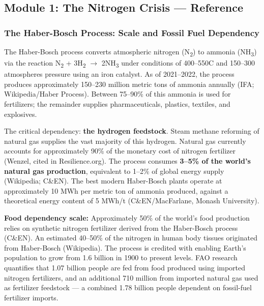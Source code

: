 \documentclass[11pt,letterpaper]{article}
\begin{document}
\subsection{Module 1: The Nitrogen Crisis --- Reference}

\subsubsection{The Haber-Bosch Process: Scale and Fossil Fuel Dependency}

The Haber-Bosch process converts atmospheric nitrogen (N\textsubscript{2}) to ammonia (NH\textsubscript{3}) via the reaction N\textsubscript{2} + 3H\textsubscript{2} $\rightarrow$ 2NH\textsubscript{3} under conditions of 400--550\textdegree C and 150--300 atmospheres pressure using an iron catalyst. As of 2021--2022, the process produces approximately 150--230 million metric tons of ammonia annually (IFA; Wikipedia/Haber Process). Between 75--90\% of this ammonia is used for fertilizers; the remainder supplies pharmaceuticals, plastics, textiles, and explosives.

The critical dependency: \textbf{the hydrogen feedstock}. Steam methane reforming of natural gas supplies the vast majority of this hydrogen. Natural gas currently accounts for approximately 90\% of the monetary cost of nitrogen fertilizer (Wenzel, cited in Resilience.org). The process consumes \textbf{3--5\% of the world's natural gas production}, equivalent to 1--2\% of global energy supply (Wikipedia; C\&EN). The best modern Haber-Bosch plants operate at approximately 10 MWh per metric ton of ammonia produced, against a theoretical energy content of 5 MWh/t (C\&EN/MacFarlane, Monash University).

\textbf{Food dependency scale:} Approximately 50\% of the world's food production relies on synthetic nitrogen fertilizer derived from the Haber-Bosch process (C\&EN). An estimated 40--50\% of the nitrogen in human body tissues originated from Haber-Bosch (Wikipedia). The process is credited with enabling Earth's population to grow from 1.6 billion in 1900 to present levels. FAO research quantifies that 1.07 billion people are fed from food produced using imported nitrogen fertilizers, and an additional 710 million from imported natural gas used as fertilizer feedstock --- a combined 1.78 billion people dependent on fossil-fuel fertilizer imports.
\end{document}
